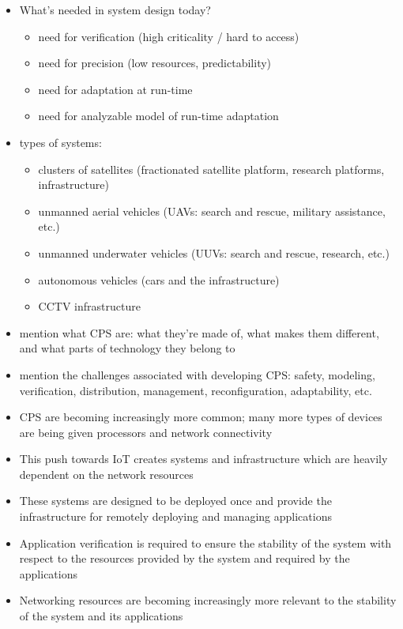 \iffalse
\begin{itemize}
	\item What's needed in system design today?
	\begin{itemize}
		\item need for verification (high criticality / hard to access)
		\item need for precision (low resources, predictability)
		\item need for adaptation at run-time
		\item need for analyzable model of run-time adaptation
	\end{itemize}
	\item types of systems:
	\begin{itemize}
		\item clusters of satellites (fractionated satellite platform, research platforms, infrastructure)
		\item unmanned aerial vehicles (UAVs: search and rescue, military assistance, etc.)
		\item unmanned underwater vehicles (UUVs: search and rescue, research, etc.)
		\item autonomous vehicles (cars and the infrastructure)
		\item CCTV infrastructure
	\end{itemize}
	\item mention what CPS are: what they're made of, what makes them different, and what parts of technology they belong to
	\item mention the challenges associated with developing CPS: safety, modeling, verification, distribution, management, reconfiguration, adaptability, etc.
	\item CPS are becoming increasingly more common; many more types of devices are being given processors and network connectivity
	\item This push towards IoT creates systems and infrastructure which are heavily dependent on the network resources
	\item These systems are designed to be deployed once and provide the infrastructure for remotely deploying and managing applications 
	\item Application verification is required to ensure the stability of the system with respect to the resources provided by the system and required by the applications
	\item Networking resources are becoming increasingly more relevant to the stability of the system and its applications

\end{itemize}
